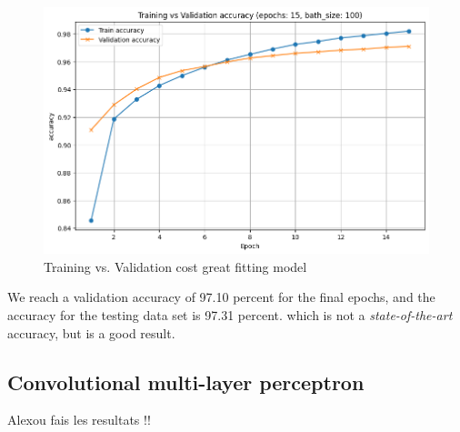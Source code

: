 \documentclass[a4paper, twocolumn, twoside]{article}
\begin{document}
	\begin{figure}[H]
		\begin{center}
			\includegraphics[width=\columnwidth]{images/accuracy_greatfit.png}
		\end{center}
		\caption{Training vs. Validation cost great fitting model}\label{fig:accuracy_greatfit}
	\end{figure}
	We reach a validation accuracy of 97.10 percent for the final epochs, and the accuracy for the testing data set is 97.31 percent.
	which is not a \textit{state-of-the-art} accuracy, but is a good result.
	\subsection{Convolutional multi-layer perceptron}
        Alexou fais les resultats !!

	\onecolumn
\end{document}
